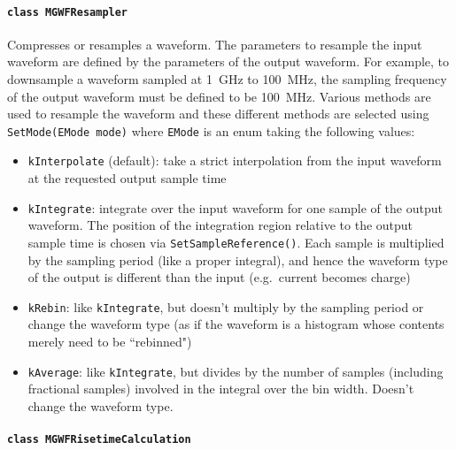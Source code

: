 			\paragraph{\lstinline!class MGWFResampler!} 

Compresses or resamples a waveform.  The parameters to resample the input waveform are defined by the parameters of the output waveform.  For example, to downsample a waveform sampled at 1~GHz to 100~MHz, the sampling frequency of the output waveform must be defined to be 100~MHz.  Various methods are used to resample the waveform and these different methods are selected using \lstinline!SetMode(EMode mode)! where \lstinline!EMode! is an enum taking the following values:
				\begin{itemize}
					\item \lstinline!kInterpolate! (default): take a strict interpolation from the input
					 waveform at the requested output sample time
					\item \lstinline!kIntegrate!: integrate over the input waveform for one sample of the
					 output waveform. The position of the integration region relative to
					 the output sample time is chosen via \lstinline!SetSampleReference()!. Each
					 sample is multiplied by the sampling period (like a proper
					 integral), and hence the waveform type of the output is different
					 than the input (e.g.~current becomes charge)
					\item \lstinline!kRebin!: like \lstinline!kIntegrate!, but doesn't multiply by the sampling period
					 or change the waveform type (as if the waveform is a histogram whose
					 contents merely need to be ``rebinned")
					\item \lstinline!kAverage!: like \lstinline!kIntegrate!, but divides by the number of samples
					 (including fractional samples) involved in the integral over the bin
					 width. Doesn't change the waveform type.

				\end{itemize}				  
			
			\paragraph{\lstinline!class MGWFRisetimeCalculation!} 

